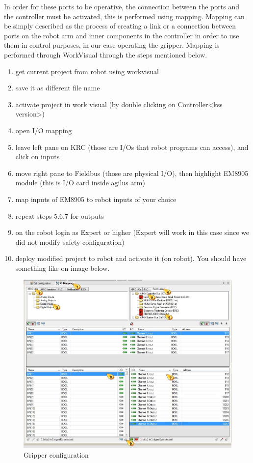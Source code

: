 	In order for these ports to be operative, the connection between the ports and the controller must be activated, this is performed using mapping. Mapping can be simply described as the process of creating a link or a connection between ports on the robot arm and inner components in the controller in order to use them in control purposes, in our case operating the gripper. Mapping is performed through WorkVisual through the steps mentioned below.
		\begin{enumerate}
			\item get current project from robot using workvisual
			\item save it as different file name
			\item activate project in work visual (by double clicking on Controller<kss version>)
			\item open I/O mapping
			\item leave left pane on KRC (those are I/Os that robot programs can access), and click on inputs
			\item move right pane to Fieldbus (those are physical I/O), then highlight EM8905 module (this is I/O card inside agilus arm)
			\item map inputs of EM8905 to robot inputs of your choice
			\item repeat steps 5.6.7 for outputs
			\item on the robot login as Expert or higher (Expert will work in this case since we did not modify safety configuration)
			\item deploy modified project to robot and activate it (on robot).
			You should have something like on image below. 
		\end{enumerate}
\begin{figure}[H]
    \centering
    \includegraphics[width=\textwidth]{figures/gripper3}
    \caption{Gripper configuration}
    \label{fig:gripperconfig}
\end{figure}


